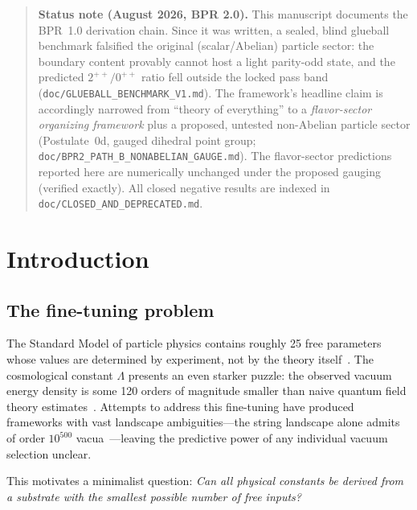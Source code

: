 \documentclass[aps,prd,twocolumn,superscriptaddress,longbibliography,nofootinbib]{revtex4-2}
\begin{document}
\begin{quote}
\textbf{Status note (August 2026, BPR 2.0).}  This manuscript
documents the BPR~1.0 derivation chain.  Since it was written, a
sealed, blind glueball benchmark falsified the original
(scalar/Abelian) particle sector: the boundary content provably
cannot host a light parity-odd state, and the predicted
$2^{++}/0^{++}$ ratio fell outside the locked pass band
(\texttt{doc/GLUEBALL\_BENCHMARK\_V1.md}).  The framework's headline
claim is accordingly narrowed from ``theory of everything'' to a
\emph{flavor-sector organizing framework} plus a proposed, untested
non-Abelian particle sector (Postulate~0d, gauged dihedral point
group; \texttt{doc/BPR2\_PATH\_B\_NONABELIAN\_GAUGE.md}).  The
flavor-sector predictions reported here are numerically unchanged
under the proposed gauging (verified exactly).  All closed negative
results are indexed in \texttt{doc/CLOSED\_AND\_DEPRECATED.md}.
\end{quote}

\section{Introduction}
\label{sec:intro}

\subsection{The fine-tuning problem}

The Standard Model of particle physics contains roughly 25 free
parameters whose values are determined by experiment, not by the
theory itself~\cite{PDG2024}.  The cosmological constant
$\Lambda$ presents an even starker puzzle: the observed vacuum
energy density is some 120 orders of magnitude smaller than naive
quantum field theory estimates~\cite{Weinberg1989}.  Attempts to
address this fine-tuning have produced frameworks with vast
landscape ambiguities---the string landscape alone admits of order
$10^{500}$ vacua~\cite{Bousso2000}---leaving the predictive power
of any individual vacuum selection unclear.

This motivates a minimalist question: \textit{Can all physical
constants be derived from a substrate with the smallest possible
number of free inputs?}
\end{document}
